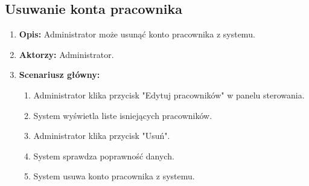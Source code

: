 \subsection{Usuwanie konta pracownika}
\begin{enumerate}
    \item \textbf{Opis:} Administrator może usunąć konto pracownika z systemu.
    \item \textbf{Aktorzy:} Administrator.
    \item \textbf{Scenariusz główny:} 
    \begin{enumerate}
        \item Administrator klika przycisk "Edytuj pracowników" w panelu sterowania.
        \item System wyświetla liste isniejących pracowników.
        \item Administrator klika przycisk "Usuń".
        \item System sprawdza poprawność danych.
        \item System usuwa konto pracownika z systemu.
    \end{enumerate}
\end{enumerate}

